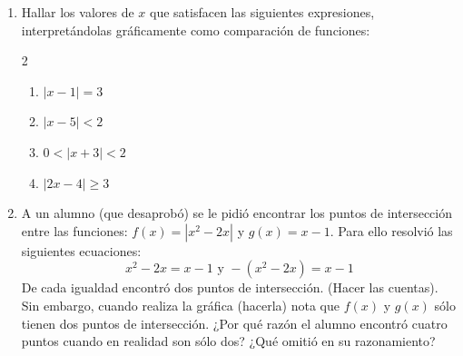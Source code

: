 \documentclass[12pt]{article}
\theoremstyle{definition}
\begin{document}
\begin{enumerate}
\begin{equation*}
\begin{aligned}
	-(x+2) \text{ si } x \in (-\infty, -2)
	\end{aligned}
	\right.
\end{equation*}
\begin{multicols}{2}
\begin{enumerate}
\item $f(x) = 2x-1$ 
\item $f(x) = x^{2}-2x$ 
\item $f(x) = (x-1).(x-2)$ 
\item $f(x) = x^{3}-1$ 
\item $f(x) = \sin x$ si $x \in [0, 2\pi]$
\item $f(x) =\cos x$ 
\item $f(x) =\frac{1}{x}$ 
\item $f(x) = -4-3x$ 
\item $f(x) =9-x^{2} $ 
\item $f(x) =\frac{1}{2-x}$ 
\item $f(x) = x.(x-1).(x+1)$
\item $f(x) =  \ln x$  
\end{enumerate}
\end{multicols}

\item  Hallar los valores de $x$ que satisfacen las siguientes expresiones, interpretándolas gráficamente como comparación de funciones:
\begin{multicols}{2}
\begin{enumerate}
\item $|x-1|=3$ 
\item $|x-5| <2$ 
\item $0 < |x+3|<2$ 
\item $|2x-4| \geq 3$ 
\end{enumerate}
\end{multicols}


\item  A un alumno (que desaprobó)  se le pidió encontrar los puntos de intersección entre las funciones: $f(x) = | x^{2}-2x|$ y $g(x) = x-1$.  Para ello resolvió las siguientes ecuaciones:
\begin{equation*}
  	x^{2}-2x = x-1   \text{   y    } -(x^{2}-2x) = x-1
\end{equation*}
\noindent
De cada igualdad encontró dos puntos de intersección. (Hacer las cuentas). Sin embargo, cuando realiza la gráfica (hacerla) nota que $f(x)$ y $g(x)$ sólo tienen dos puntos de intersección. ¿Por qué razón el alumno encontró cuatro puntos cuando en realidad son sólo dos? ¿Qué omitió en su razonamiento?


\end{enumerate}
\end{document}
